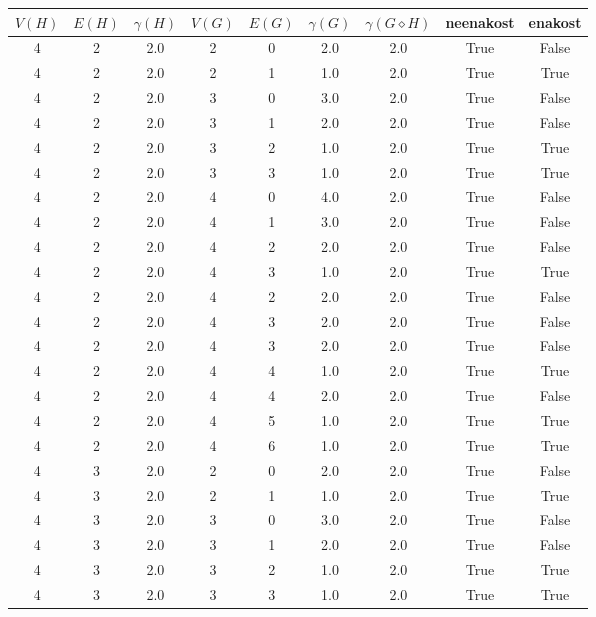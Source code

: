 \documentclass[a4paper,12pt]{article}
\begin{document}
\begin{center}
    \begin{tabular}{ c c c | c c c | c | c | c}
        $V(H)$ & $E(H)$ & $\gamma(H)$ & $V(G)$ & $E(G)$ & $\gamma(G)$ & $\gamma(G \diamond H)$ & neenakost & enakost \\
        \hline
        4 & 2 & 2.0 & 2 & 0 & 2.0 & 2.0 & True & False    \\
        4 & 2 & 2.0 & 2 & 1 & 1.0 & 2.0 & True & True     \\
        4 & 2 & 2.0 & 3 & 0 & 3.0 & 2.0 & True & False    \\
        4 & 2 & 2.0 & 3 & 1 & 2.0 & 2.0 & True & False    \\
        4 & 2 & 2.0 & 3 & 2 & 1.0 & 2.0 & True & True     \\
        4 & 2 & 2.0 & 3 & 3 & 1.0 & 2.0 & True & True     \\
        4 & 2 & 2.0 & 4 & 0 & 4.0 & 2.0 & True & False    \\
        4 & 2 & 2.0 & 4 & 1 & 3.0 & 2.0 & True & False    \\
        4 & 2 & 2.0 & 4 & 2 & 2.0 & 2.0 & True & False    \\
        4 & 2 & 2.0 & 4 & 3 & 1.0 & 2.0 & True & True     \\
        4 & 2 & 2.0 & 4 & 2 & 2.0 & 2.0 & True & False    \\
        4 & 2 & 2.0 & 4 & 3 & 2.0 & 2.0 & True & False    \\
        4 & 2 & 2.0 & 4 & 3 & 2.0 & 2.0 & True & False    \\
        4 & 2 & 2.0 & 4 & 4 & 1.0 & 2.0 & True & True     \\
        4 & 2 & 2.0 & 4 & 4 & 2.0 & 2.0 & True & False    \\
        4 & 2 & 2.0 & 4 & 5 & 1.0 & 2.0 & True & True     \\
        4 & 2 & 2.0 & 4 & 6 & 1.0 & 2.0 & True & True     \\
        4 & 3 & 2.0 & 2 & 0 & 2.0 & 2.0 & True & False    \\
        4 & 3 & 2.0 & 2 & 1 & 1.0 & 2.0 & True & True     \\
        4 & 3 & 2.0 & 3 & 0 & 3.0 & 2.0 & True & False    \\
        4 & 3 & 2.0 & 3 & 1 & 2.0 & 2.0 & True & False    \\
        4 & 3 & 2.0 & 3 & 2 & 1.0 & 2.0 & True & True     \\
        4 & 3 & 2.0 & 3 & 3 & 1.0 & 2.0 & True & True     \\

\end{tabular}
\end{center}
\end{document}
